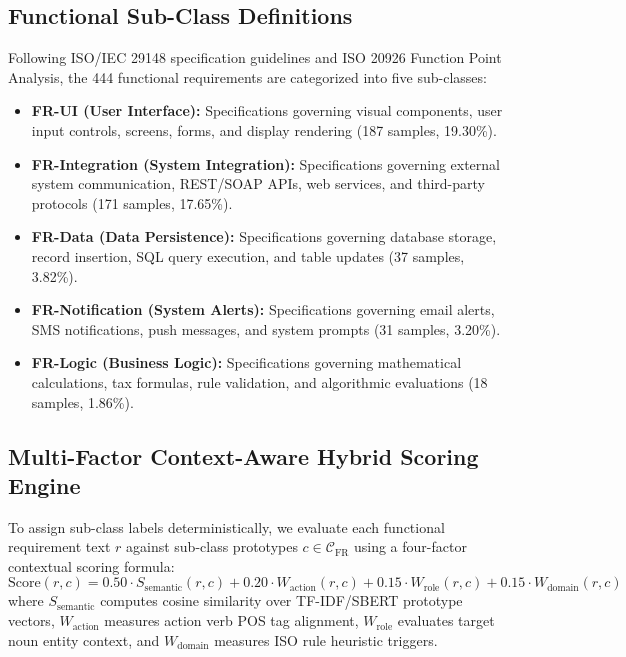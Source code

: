 \documentclass[pdflatex,sn-mathphys-num]{sn-jnl}
\begin{document}
\subsection{Functional Sub-Class Definitions}
Following ISO/IEC 29148 specification guidelines and ISO 20926 Function Point Analysis, the 444 functional requirements are categorized into five sub-classes:
\begin{itemize}
    \item \textbf{FR-UI (User Interface):} Specifications governing visual components, user input controls, screens, forms, and display rendering (187 samples, 19.30\%).
    \item \textbf{FR-Integration (System Integration):} Specifications governing external system communication, REST/SOAP APIs, web services, and third-party protocols (171 samples, 17.65\%).
    \item \textbf{FR-Data (Data Persistence):} Specifications governing database storage, record insertion, SQL query execution, and table updates (37 samples, 3.82\%).
    \item \textbf{FR-Notification (System Alerts):} Specifications governing email alerts, SMS notifications, push messages, and system prompts (31 samples, 3.20\%).
    \item \textbf{FR-Logic (Business Logic):} Specifications governing mathematical calculations, tax formulas, rule validation, and algorithmic evaluations (18 samples, 1.86\%).
\end{itemize}

\subsection{Multi-Factor Context-Aware Hybrid Scoring Engine}
To assign sub-class labels deterministically, we evaluate each functional requirement text $r$ against sub-class prototypes $c \in \mathcal{C}_{\text{FR}}$ using a four-factor contextual scoring formula:
\begin{equation}
\text{Score}(r, c) = 0.50 \cdot S_{\text{semantic}}(r, c) + 0.20 \cdot W_{\text{action}}(r, c) + 0.15 \cdot W_{\text{role}}(r, c) + 0.15 \cdot W_{\text{domain}}(r, c)
\end{equation}
where $S_{\text{semantic}}$ computes cosine similarity over TF-IDF/SBERT prototype vectors, $W_{\text{action}}$ measures action verb POS tag alignment, $W_{\text{role}}$ evaluates target noun entity context, and $W_{\text{domain}}$ measures ISO rule heuristic triggers.
\end{document}

